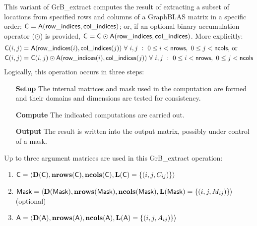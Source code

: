 This variant of {\sf GrB\_extract} computes the result of extracting a subset of
locations from specified rows and columns of a GraphBLAS matrix in a specific 
order: ${\sf C} = {\sf A}({\sf row\_indices},{\sf col\_indices})$; or, if an 
optional binary accumulation operator ($\odot$) is provided, 
${\sf C} = {\sf C} \odot {\sf A}({\sf row\_indices},{\sf col\_indices})$.  
More explicitly:
\[
\begin{aligned}
    {\sf C}(i,j) = &\ {\sf A}({\sf row\_indices}(i),{\sf col\_indices}(j)) 
    \ \forall \ i,j \ : \ 0 \leq i < {\sf nrows},\ 0 \leq j < {\sf ncols} \mbox{,~or~}
    \\
    {\sf C}(i,j) = &\ {\sf C}(i,j) \odot {\sf A}({\sf row\_indices}(i),{\sf col\_indices}(j))
    \ \forall \ i,j \ : \ 0 \leq i < {\sf nrows},\ 0 \leq j < {\sf ncols}
\end{aligned}
\]  
Logically, this operation occurs in three steps:
\begin{enumerate}[leftmargin=0.75in]
\item[\bf Setup] The internal matrices and mask used in the computation are formed 
and their domains and dimensions are tested for consistency.
\item[\bf Compute] The indicated computations are carried out.
\item[\bf Output] The result is written into the output matrix, possibly under 
control of a mask.
\end{enumerate}

Up to three argument matrices are used in this {\sf GrB\_extract} operation:
\begin{enumerate}
	\item ${\sf C} = \langle \bold{D}({\sf C}),\bold{nrows}({\sf C}),
    \bold{ncols}({\sf C}),\bold{L}({\sf C}) = \{(i,j,C_{ij}) \} \rangle$
    
	\item ${\sf Mask} = \langle \bold{D}({\sf Mask}),\bold{nrows}({\sf Mask}),
    \bold{ncols}({\sf Mask}),\bold{L}({\sf Mask}) = \{(i,j,M_{ij}) \} \rangle$ (optional)

	\item ${\sf A} = \langle \bold{D}({\sf A}),\bold{nrows}({\sf A}),
    \bold{ncols}({\sf A}),\bold{L}({\sf A}) = \{(i,j,A_{ij}) \} \rangle$
\end{enumerate}

